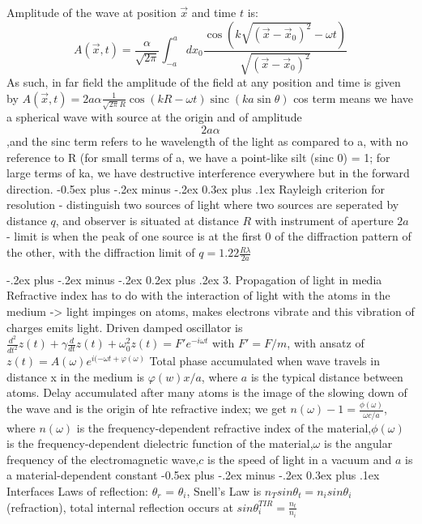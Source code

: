 \documentclass[a4paper,11pt,portrait]{article}
\makeatletter
\DeclareMathOperator{\sinc}{sinc}
\renewcommand{\section}{\@startsection{section}{1}{0mm}%
                            {-.2ex plus -.2ex minus -.2ex}%
                            {0.2ex plus .2ex}%
                            {\normalfont\tiny\bfseries}}
\renewcommand{\subsection}{\@startsection{subsection}{2}{0mm}%
                                {-0.5ex plus -.2ex minus -.2ex}%
                                {0.3ex plus .1ex}%
                                {\normalfont\footnotesize\bfseries}}
\makeatother
\begin{document}
\begin{multicols}{3}
Amplitude of the wave at position $\vec{x}$ and time $t$ is:
$$
A(\vec{x},t) = \frac{\alpha}{\sqrt{2\pi}}\int_{-a}^{a} dx_0 \frac{\cos(k\sqrt{(\vec{x} - \vec{x}_0)^2}-\omega t)}{\sqrt{(\vec{x} - \vec{x}_0)^2}}
$$
As such, in far field the amplitude of the field at any position and time is given by $A(\vec{x},t) = 2a\alpha \frac{1}{\sqrt{2\pi}R} \cos(kR - \omega t) \sinc(ka\sin\theta)$ cos term means we have a spherical wave with source at the origin and of amplitude $$2a\alpha$$,and the sinc term refers to he wavelength of the light as compared to a, with no reference to R (for small terms of a, we have a point-like silt (sinc 0) = 1; for large terms of ka, we have destructive interference everywhere but in the forward direction.
\subsection{Rayleigh criterion for resolution} - distinguish two sources of light where two sources are seperated by distance $q$, and observer is situated at distance $R$ with instrument of aperture $2a$ - limit is when the peak of one source is at the first 0 of the diffraction pattern of the other, with the diffraction limit of $q = 1.22 \frac{R \lambda} {2a}$

\section{3. Propagation of light in media}
Refractive index has to do with the interaction of light with the atoms in the medium -> light impinges on atoms, makes electrons vibrate and this vibration of charges emits light. 
Driven damped oscillator is $\frac{d^2}{dt^2} z(t) + \gamma \frac{d}{dt}z(t) + \omega_0^2 z(t) = F' e^{-i\omega t}$ with $F' = F/m$, with ansatz of $z(t) = A(\omega) e^{i(-\omega t + \varphi(\omega)}$
Total phase accumulated when wave travels in distance x in the medium is $\varphi(w)x/a$, where $a$ is the typical distance between atoms. Delay accumulated after many atoms is the image of the slowing down of the wave and is the origin of hte refractive index; we get  $n(\omega) - 1 = \frac{\phi(\omega)}{\omega c/a}$, where $n(\omega)$ is the frequency-dependent refractive index of the material,$\phi(\omega)$ is the frequency-dependent dielectric function of the material,$\omega$ is the angular frequency of the electromagnetic wave,$c$ is the speed of light in a vacuum
and $a$ is a material-dependent constant
\subsection{Interfaces}
Laws of reflection: $\theta_r$ = $\theta_i$, Snell's Law is $n_T sin \theta_t = n_i sin \theta_i$ (refraction), total internal reflection occurs at $sin \theta_i^{TIR} = \frac{n_t}{n_i}$

\end{multicols}
\end{document}

